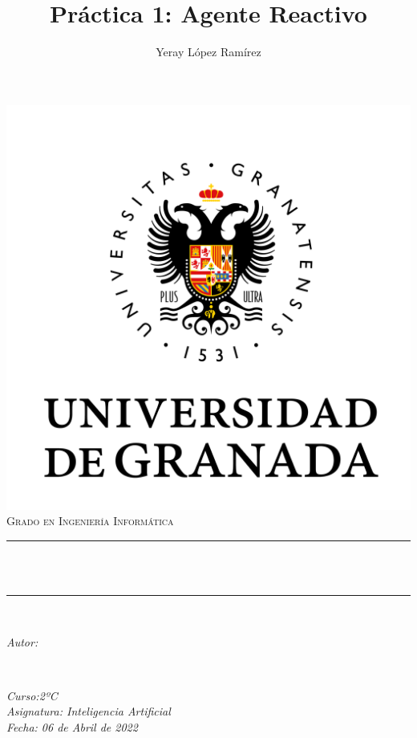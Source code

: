 \documentclass[12pt, spanish]{article}
\title{Práctica 1: Agente Reactivo \hspace{0.05cm} }
\date{}
\author{
Yeray López Ramírez \\
}
\makeatletter
\let\thetitle\@title
\let\theauthor\@author
\makeatother
\begin{document}
\begin{titlepage}
  \centering
  \vspace*{0.5 cm}
  \includegraphics[scale = 0.50]{ugr.png}\\[1.0 cm]
  \textsc{\huge Grado en Ingeniería Informática}\\[0.5 cm]
  \rule{\linewidth}{0.2 mm} \\[0.4 cm]
  { \huge \bfseries \thetitle}\\
  \rule{\linewidth}{0.2 mm} \\[1.5 cm]
  
  \begin{minipage}{0.4\textwidth}
    \begin{flushleft} \large
        \emph{Autor:}\\

        \theauthor
        \end{flushleft}
        \end{minipage}~
        \begin{minipage}{0.4\textwidth}
        \begin{flushright} \large
        \emph{Curso:2ºC \\
        Asignatura: Inteligencia Artificial \\
        Fecha: 06 de Abril de 2022
        }
    \end{flushright}
\end{minipage}\\[1 cm]


\vfill
  
\end{titlepage}
\end{document}
